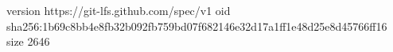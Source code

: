 version https://git-lfs.github.com/spec/v1
oid sha256:1b69c8bb4e8fb32b092fb759bd07f682146e32d17a1ff1e48d25e8d45766ff16
size 2646
